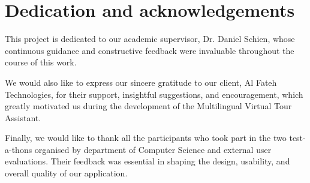 \chapter*{Dedication and acknowledgements}
\setlength{\parindent}{0pt}

This project is dedicated to our academic supervisor, Dr. Daniel Schien, whose continuous guidance and constructive feedback were invaluable throughout the course of this work.
\vspace{0.5cm}

We would also like to express our sincere gratitude to our client, Al Fateh Technologies, for their support, insightful suggestions, and encouragement, which greatly motivated us during the development of the Multilingual Virtual Tour Assistant.
\vspace{0.5cm}

Finally, we would like to thank all the participants who took part in the two test-a-thons organised by department of Computer Science and external user evaluations. Their feedback was essential in shaping the design, usability, and overall quality of our application.

